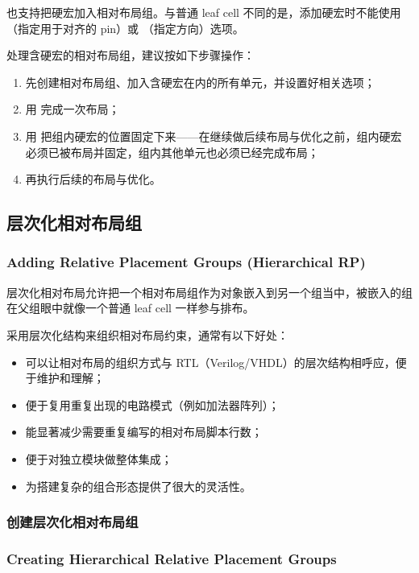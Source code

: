  也支持把硬宏加入相对布局组。与普通 leaf cell 不同的是，添加硬宏时不能使用 （指定用于对齐的 pin）或 （指定方向）选项。

处理含硬宏的相对布局组，建议按如下步骤操作：
\begin{enumerate}
  \item 先创建相对布局组、加入含硬宏在内的所有单元，并设置好相关选项；
  \item 用  完成一次布局；
  \item 用  把组内硬宏的位置固定下来——在继续做后续布局与优化之前，组内硬宏必须已被布局并固定，组内其他单元也必须已经完成布局；
  \item 再执行后续的布局与优化。
\end{enumerate}

\subsection{层次化相对布局组}
\subsubsection*{Adding Relative Placement Groups (Hierarchical RP)}

层次化相对布局允许把一个相对布局组作为对象嵌入到另一个组当中，被嵌入的组在父组眼中就像一个普通 leaf cell 一样参与排布。

采用层次化结构来组织相对布局约束，通常有以下好处：
\begin{itemize}
  \item 可以让相对布局的组织方式与 RTL（Verilog/VHDL）的层次结构相呼应，便于维护和理解；
  \item 便于复用重复出现的电路模式（例如加法器阵列）；
  \item 能显著减少需要重复编写的相对布局脚本行数；
  \item 便于对独立模块做整体集成；
  \item 为搭建复杂的组合形态提供了很大的灵活性。
\end{itemize}

\subsubsection{创建层次化相对布局组}
\subsubsection*{Creating Hierarchical Relative Placement Groups}

